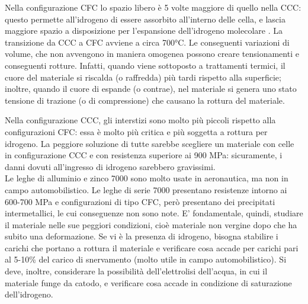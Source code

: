 Nella configurazione CFC lo spazio libero è 5 volte maggiore di quello nella CCC: questo permette all'idrogeno di essere assorbito all'interno delle cella, e lascia maggiore spazio a disposizione per l'espansione dell'idrogeno molecolare .
 La transizione da CCC a CFC avviene a circa 700°C. Le conseguenti variazioni di volume, che non avvengono in maniera omogenea possono creare tensionamenti e conseguenti rotture. Infatti, quando viene sottoposto a trattamenti termici, il cuore del materiale si riscalda (o raffredda) più tardi rispetto alla superficie; inoltre, quando il cuore di espande (o contrae), nel materiale si genera uno stato tensione di trazione (o di compressione) che causano la rottura del materiale.
 
 Nella configurazione CCC, gli interstizi sono molto più piccoli rispetto alla configurazioni CFC: essa è molto più critica e più soggetta a rottura per idrogeno.
La peggiore soluzione di tutte sarebbe scegliere un materiale con celle in configurazione CCC e con resistenza superiore ai 900 MPa: sicuramente, i danni dovuti all’ingresso di idrogeno sarebbero gravissimi.\\
Le leghe di alluminio e zinco 7000 sono molto usate in aeronautica, ma non in campo automobilistico. Le leghe di serie 7000 presentano resistenze intorno ai 600-700 MPa e configurazioni di tipo CFC, però presentano dei precipitati intermetallici, le cui conseguenze non sono note.
E’ fondamentale, quindi, studiare il materiale nelle sue peggiori condizioni, cioè materiale non vergine dopo che ha subito una deformazione. Se vi è la presenza di idrogeno, bisogna stabilire i carichi che portano a rottura il materiale e verificare cosa accade per carichi pari al 5-10\% del carico di snervamento (molto utile in campo automobilistico). Si deve, inoltre, considerare la possibilità dell’elettrolisi dell’acqua, in cui il materiale funge da catodo, e verificare cosa accade in condizione di saturazione dell’idrogeno.

